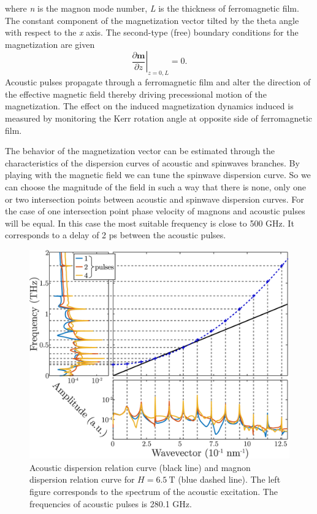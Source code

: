 \documentclass[%
superscriptaddress,
preprint,
showpacs,
amsmath,
amssymb,
aps,
prl,
]{revtex4-1}
\begin{document}
where \textit{n} is the magnon mode number, \textit{L} is the thickness of ferromagnetic film. The constant component of the magnetization vector tilted by the theta angle with respect to the \textit{x} axis.  The second-type (free) boundary conditions for the magnetization are given
\begin{equation}
	\left.\frac{\partial \mathbf{m}}{\partial z}\right|_{z=0,L} = 0.
	\label{eq:Boundary_cond}
\end{equation}
Acoustic pulses propagate through a ferromagnetic film and alter the direction of the effective magnetic field thereby driving precessional motion of the magnetization. The effect on the induced magnetization dynamics induced is measured by monitoring the Kerr rotation angle at opposite side of ferromagnetic film.
	
The behavior of the magnetization vector can be estimated through the characteristics of the dispersion curves of acoustic and spinwaves branches. By playing with the magnetic field we can tune the spinwave dispersion curve. So we can choose the magnitude of the field in such a way that there is none, only one or two intersection points between acoustic and spinwave dispersion curves. For the case of one intersection point phase velocity of magnons and acoustic pulses will be equal. In this case the most suitable frequency is close to 500 GHz. It corresponds to a delay of 2 ps between the acoustic pulses.
	
\begin{figure}[ht]
	\centering
	\includegraphics[width=0.95\columnwidth]{Figures/dispersionRelation-H6.5T-Ni30nm-3.57_2ps.eps}
	\caption{Acoustic dispersion relation curve (black line) and magnon dispersion relation curve for $H = 6.5\ \mathrm{T}$ (blue dashed line). The left figure corresponds to the spectrum of the acoustic excitation. The frequencies of acoustic pulses is 280.1 GHz.}
	\label{fig:dispersionRelationHNi}
\end{figure}
	
\end{document}
